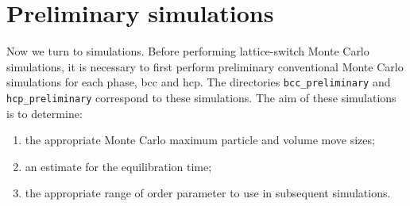\documentclass{report}
\begin{document}
\section{Preliminary simulations}
Now we turn to simulations. Before performing lattice-switch Monte Carlo simulations, it is necessary to first perform
preliminary conventional Monte Carlo simulations for each phase, bcc and hcp. The directories \texttt{bcc\_preliminary}
and \texttt{hcp\_preliminary} correspond to these simulations. The aim of these simulations is to determine:
\begin{enumerate}
\item the appropriate Monte Carlo maximum particle and volume move sizes;
\item an estimate for the equilibration time;
\item the appropriate range of order parameter to use in subsequent simulations.
\end{enumerate}
\end{document}

